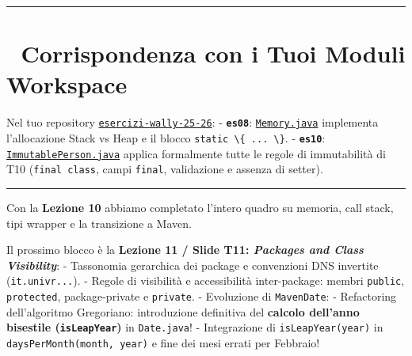 \documentclass[11pt,a4paper,oneside]{report}
\newcommand{\passthrough}[1]{#1}
\begin{document}
\begin{center}\rule{0.5\linewidth}{0.5pt}\end{center}

\section{🔄 Corrispondenza con i Tuoi Moduli
Workspace}\label{chap09_corrispondenza-con-i-tuoi-moduli-workspace}

Nel tuo repository
\href{file:///home/wally/Documenti/GitHub/Programmazione-II/25-26/esercizi-wally-25-26}{\passthrough{\lstinline!esercizi-wally-25-26!}}:
- \textbf{\passthrough{\lstinline!es08!}}:
\href{file:///home/wally/Documenti/GitHub/Programmazione-II/25-26/esercizi-wally-25-26/es08/src/main/java/es08/Memory.java}{\passthrough{\lstinline!Memory.java!}}
implementa l'allocazione Stack vs Heap e il blocco
\passthrough{\lstinline!static \{ ... \}!}. -
\textbf{\passthrough{\lstinline!es10!}}:
\href{file:///home/wally/Documenti/GitHub/Programmazione-II/25-26/esercizi-wally-25-26/es10/src/main/java/es10/ImmutablePerson.java}{\passthrough{\lstinline!ImmutablePerson.java!}}
applica formalmente tutte le regole di immutabilità di T10
(\passthrough{\lstinline!final class!}, campi
\passthrough{\lstinline!final!}, validazione e assenza di setter).

\begin{center}\rule{0.5\linewidth}{0.5pt}\end{center}

\begin{studynote} Con la \textbf{Lezione 10} abbiamo completato l'intero
quadro su memoria, call stack, tipi wrapper e la transizione a Maven.

Il prossimo blocco è la \textbf{Lezione 11 / Slide T11: \emph{Packages
and Class Visibility}}: - Tassonomia gerarchica dei package e
convenzioni DNS invertite (\passthrough{\lstinline!it.univr...!}). -
Regole di visibilità e accessibilità inter-package: membri
\passthrough{\lstinline!public!}, \passthrough{\lstinline!protected!},
package-private e \passthrough{\lstinline!private!}. - Evoluzione di
\passthrough{\lstinline!MavenDate!}: - Refactoring dell'algoritmo
Gregoriano: introduzione definitiva del \textbf{calcolo dell'anno
bisestile (\passthrough{\lstinline!isLeapYear!})} in
\passthrough{\lstinline!Date.java!}! - Integrazione di
\passthrough{\lstinline!isLeapYear(year)!} in
\passthrough{\lstinline!daysPerMonth(month, year)!} e fine dei mesi
errati per Febbraio!
\end{studynote}
\end{document}
